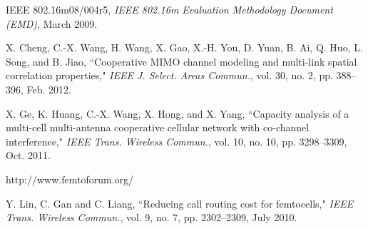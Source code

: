 \documentclass[10pt,final,journal,letterpaper,twoside,twocolumn]{IEEEtran}
\begin{document}
\begin{thebibliography}{1}
    IEEE 802.16m08/004r5, {\em IEEE 802.16m Evaluation Methodology Document (EMD)}, March 2009.

X. Cheng, C.-X. Wang, H. Wang, X. Gao, X.-H. You, D. Yuan, B. Ai, Q. Huo, L.
Song, and B. Jiao, ``Cooperative MIMO channel modeling and multi-link spatial
correlation properties," {\em IEEE J. Select. Areas Commun.}, vol. 30,
no. 2, pp. 388--396, Feb. 2012.

X. Ge, K. Huang, C.-X. Wang, X. Hong, and X. Yang, ``Capacity analysis of a multi-cell multi-antenna cooperative cellular network with co-channel interference," {\em IEEE Trans. Wireless Commun.}, vol. 10, no. 10, pp. 3298--3309, Oct. 2011.

    http://www.femtoforum.org/

Y. Lin, C. Gan and C. Liang, ``Reducing call routing cost for femtocells,"
{\em IEEE Trans. Wireless Commun.}, vol. 9, no. 7, pp. 2302--2309, July 2010.
\end{thebibliography}
\end{document}
